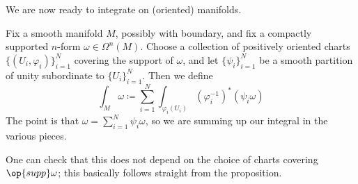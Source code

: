 \documentclass[../notes.tex]{subfiles}
\begin{document}
We are now ready to integrate on (oriented) manifolds.
\begin{definition}
	Fix a smooth manifold $M$, possibly with boundary, and fix a compactly supported $n$-form $\omega\in\Omega^n(M)$. Choose a collection of positively oriented charts $\{(U_i,\varphi_i)\}_{i=1}^N$ covering the support of $\omega$, and let $\{\psi_i\}_{i=1}^N$ be a smooth partition of unity subordinate to $\{U_i\}_{i=1}^N$. Then we define
	\[\int_M\omega\coloneqq\sum_{i=1}^N\int_{\varphi_i(U_i)}\left(\varphi_i^{-1}\right)^*(\psi_i\omega)\]
	The point is that $\omega=\sum_{i=1}^N\psi_i\omega$, so we are summing up our integral in the various pieces.
\end{definition}
One can check that this does not depend on the choice of charts covering $\op{supp}\omega$; this basically follows straight from the proposition.
\end{document}
